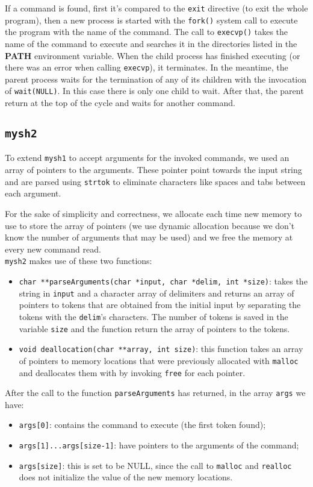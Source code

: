 If a command is found, first it's compared to the \texttt{exit} directive (to exit the whole program), then a new process is started with the \texttt{fork()} system call to execute the program with the name of the command. The call to \texttt{execvp()} takes the name of the command to execute and searches it in the directories listed in the \textbf{PATH} environment variable.
When the child process has finished executing (or there was an error when calling \texttt{execvp}), it terminates. In the meantime, the parent process waits for the termination of any of its children with the invocation of \texttt{wait(NULL)}. In this case there is only one child to wait. After that, the parent return at the top of the cycle and waits for another command.
\subsection{\texttt{mysh2}}
To extend \texttt{mysh1} to accept arguments for the invoked commands, we used an array of pointers to the arguments. These pointer point towards the input string and are parsed using \texttt{strtok} to eliminate characters like spaces and tabs between each argument. \newline

For the sake of simplicity and correctness, we allocate each time new memory to use to store the array of pointers (we use dynamic allocation because we don't know the number of arguments that may be used) and we free the memory at every new command read. \\ 

\texttt{mysh2} makes use of these two functions:
\begin{itemize}
\item{\texttt{char **parseArguments(char *input, char *delim, int *size)}}: takes the string in \texttt{input} and a character array of delimiters and returns an array of pointers to tokens that are obtained from the initial input by separating the tokens with the \texttt{delim}'s characters. The number of tokens is saved in the variable \texttt{size} and the function return the array of pointers to the tokens.
\item{\texttt{void deallocation(char **array, int size)}}: this function takes an array of pointers to memory locations that were previously allocated with \texttt{malloc} and deallocates them with by invoking \texttt{free} for each pointer.
\end{itemize}

After the call to the function \texttt{parseArguments} has returned, in the array \texttt{args} we have:
\begin{itemize}
\item \texttt{args[0]}: contains the command to execute (the first token found);
\item \texttt{args[1]...args[size-1]}: have pointers to the arguments of the command;
\item \texttt{args[size]}: this is set to be NULL, since the call to \texttt{malloc} and \texttt{realloc} does not initialize the value of the new memory locations.
\end{itemize}

